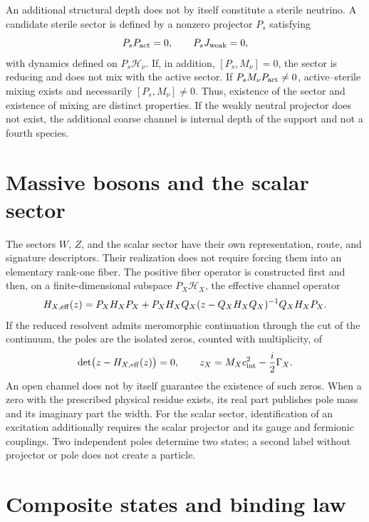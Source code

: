 An additional structural depth does not by itself constitute a sterile
neutrino. A candidate sterile sector is defined by a nonzero projector
\(P_s\) satisfying
\[
 P_s P_{\rm act}=0,
 \qquad P_s J_{\text{weak}}=0,
\]
with dynamics defined on \(P_s\mathcal H_\nu\). If, in addition,
\([P_s,M_\nu]=0\), the sector is reducing and does not mix with the active sector. If
\(P_sM_\nu P_{\rm act}\ne0\), active--sterile mixing exists and necessarily
\([P_s,M_\nu]\ne0\). Thus, existence of the sector and existence of
mixing are distinct properties. If the weakly neutral projector does not exist,
the additional coarse channel is internal depth of the support and not a fourth
species.

\section{Massive bosons and the scalar sector}

The sectors \(W\), \(Z\), and the scalar sector have their own
representation, route, and signature descriptors. Their realization does not require forcing them into an
elementary rank-one fiber. The positive fiber operator is constructed first
and then, on a finite-dimensional subspace \(P_X\mathcal H_X\), the
effective channel operator
\[
 H_{X,\rm eff}(z)
 =P_X H_X P_X
 +P_X H_X Q_X(z-Q_X H_X Q_X)^{-1}Q_X H_X P_X.
\]
If the reduced resolvent admits meromorphic continuation through the cut of the
continuum, the poles are the isolated zeros, counted with multiplicity, of
\[
 \det\bigl(z-H_{X,\rm eff}(z)\bigr)=0,
 \qquad
 z_X=M_X c_{\rm int}^2-\frac{i}{2}\Gamma_X.
\]
An open channel does not by itself guarantee the existence of such zeros. When
a zero with the prescribed physical residue exists, its real part publishes pole
mass and its imaginary part the width. For the
scalar sector, identification of an excitation additionally requires the scalar
projector and its gauge and fermionic couplings. Two independent poles
determine two states; a second label without projector or pole does not create a
particle.

\section{Composite states and binding law}

